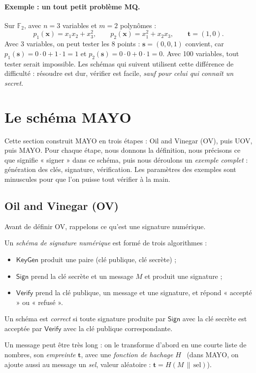 \paragraph{Exemple : un tout petit problème MQ.} Sur $\mathbb{F}_2$, avec $n=3$ variables et $m=2$ polynômes :
\[p_1(\mathbf{x})=x_1x_2+x_3^2,\qquad p_2(\mathbf{x})=x_1^2+x_2x_3,\qquad \mathbf{t}=(1,0).\]
Avec 3 variables, on peut tester les 8 points : $\mathbf{s}=(0,0,1)$ convient, car $p_1(\mathbf{s})=0\cdot0+1\cdot1=1$ et $p_2(\mathbf{s})=0\cdot0+0\cdot1=0$. Avec 100 variables, tout tester serait impossible. Les schémas qui suivent utilisent cette différence de difficulté : résoudre est dur, vérifier est facile, \emph{sauf pour celui qui connaît un secret}.

\section{Le schéma MAYO}\label{sec:schema}
Cette section construit MAYO en trois étapes : Oil and Vinegar (OV), puis UOV, puis MAYO. Pour chaque étape, nous donnons la définition, nous précisons ce que signifie « signer » dans ce schéma, puis nous déroulons un \emph{exemple complet} : génération des clés, signature, vérification. Les paramètres des exemples sont minuscules pour que l'on puisse tout vérifier à la main.

\subsection{Oil and Vinegar (OV)}
Avant de définir OV, rappelons ce qu'est une signature numérique.
\begin{definition}
Un \emph{schéma de signature numérique} est formé de trois algorithmes :
\begin{itemize}[itemsep=1pt]
\item $\mathsf{KeyGen}$ produit une paire (clé publique, clé secrète) ;
\item $\mathsf{Sign}$ prend la clé secrète et un message $M$ et produit une signature ;
\item $\mathsf{Verify}$ prend la clé publique, un message et une signature, et répond « accepté » ou « refusé ».
\end{itemize}
Un schéma est \emph{correct} si toute signature produite par $\mathsf{Sign}$ avec la clé secrète est acceptée par $\mathsf{Verify}$ avec la clé publique correspondante.
\end{definition}
Un message peut être très long : on le transforme d'abord en une courte liste de nombres, son \emph{empreinte} $\mathbf{t}$, avec une \emph{fonction de hachage} $H$~\cite{hac} (dans MAYO, on ajoute aussi au message un \emph{sel}, valeur aléatoire : $\mathbf{t}=H(M\,\|\,\text{sel})$).

